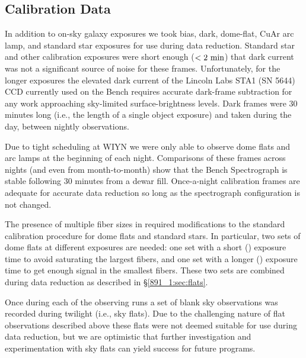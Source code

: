 
\subsection{Calibration Data}
\label{891_1:sec:cal_data}

In addition to on-sky galaxy exposures we took bias, dark, dome-flat,
CuAr arc lamp, and standard star exposures for use during data
reduction. Standard star and other calibration exposures were short
enough ($<2~\mathrm{min} $) that dark current was not a significant
source of noise for these frames. Unfortunately, for the longer
exposures the elevated dark current of the Lincoln Labs STA1 (SN 5644)
CCD currently used on the Bench requires accurate dark-frame
subtraction for any work approaching sky-limited surface-brightness
levels.  Dark frames were 30 minutes long (i.e., the length of a
single object exposure) and taken during the day, between nightly
observations.

Due to tight scheduling at WIYN we were only able to observe dome
flats and arc lamps at the beginning of each night. Comparisons
of these frames across nights (and even from month-to-month) show that
the Bench Spectrograph is stable following 30 minutes from a dewar
fill. Once-a-night calibration frames are adequate for accurate data
reduction so long as the spectrograph configuration is not changed.

The presence of multiple fiber sizes in \GP required modifications to
the standard calibration procedure for dome flats and standard
stars. In particular, two sets of dome flats at different exposures
are needed: one set with a short () exposure time to
avoid saturating the largest fibers, and one set with a longer
() exposure time to get enough signal in the smallest
fibers. These two sets are combined during data reduction as described
in \S\ref{891_1:sec:flats}.

Once during each of the observing runs a set of blank sky observations
was recorded during twilight (i.e., sky flats). Due to the challenging
nature of flat observations described above these flats were not
deemed suitable for use during data reduction, but we are optimistic
that further investigation and experimentation with sky flats can
yield success for future \GP programs.

